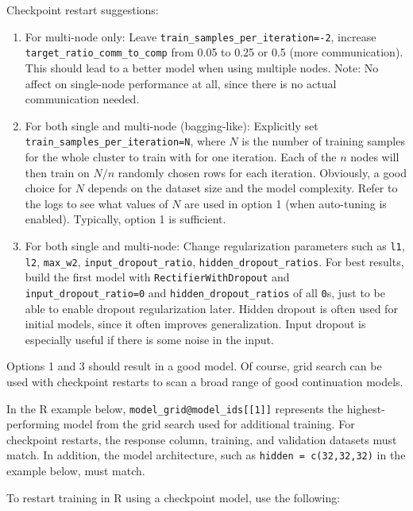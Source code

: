 {{Checkpoint restart suggestions:

\begin{enumerate}
\item For multi-node only: Leave \texttt{train\_samples\_per\_iteration=-2}, increase \texttt{target\_ratio\_comm\_to\_comp} from 0.05 to 0.25 or 0.5 (more communication). This should lead to a better model when using multiple nodes. Note: No affect on single-node performance at all, since there is no actual communication needed.
\item For both single and multi-node (bagging-like): Explicitly set \\\texttt{train\_samples\_per\_iteration=N}, where $N$ is the number of training samples for the whole cluster to train with for one iteration. Each of the $n$ nodes will then train on $N/n$ randomly chosen rows for each iteration. Obviously, a good choice for $N$ depends on the dataset size and the model complexity. Refer to the logs to see what values of $N$ are used in option 1 (when auto-tuning is enabled). Typically, option 1 is sufficient.
\item For both single and multi-node: Change regularization parameters such as \texttt{l1}, \texttt{l2}, \texttt{max\_w2}, \texttt{input\_dropout\_ratio}, \texttt{hidden\_dropout\_ratios}. For best results, build the first model with \texttt{RectifierWithDropout} and \texttt{input\_dropout\_ratio=0} and \texttt{hidden\_dropout\_ratios} of all \texttt{0}s, just to be able to enable dropout regularization later. Hidden dropout is often used for initial models, since it often improves generalization. Input dropout is especially useful if there is some noise in the input.
\end{enumerate}

Options 1 and 3 should result in a good model. Of course, grid search can be used with checkpoint restarts to scan a broad range of good continuation models.

In the R example below, \texttt{model\_grid@model\_ids[[1]]} represents the highest-performing model from the grid search used for additional training. For checkpoint restarts, the response column, training, and validation datasets must match.  In addition, the model architecture, such as \texttt{hidden = c(32,32,32)} in the example below, must match.

To restart training in R using a checkpoint model, use the following: 

\waterExampleInR


}}
